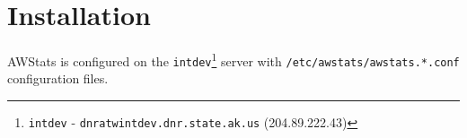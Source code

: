 
\newpage
\section{Installation}
AWStats is configured on the \texttt{intdev}\footnote{\texttt{intdev} - 
\texttt{dnratwintdev.dnr.state.ak.us} (204.89.222.43)} server
with \texttt{/etc/awstats/awstats.*.conf} configuration files.



\begin{center}
\begin{table}[htbp]
\end{table}
\end{center}





